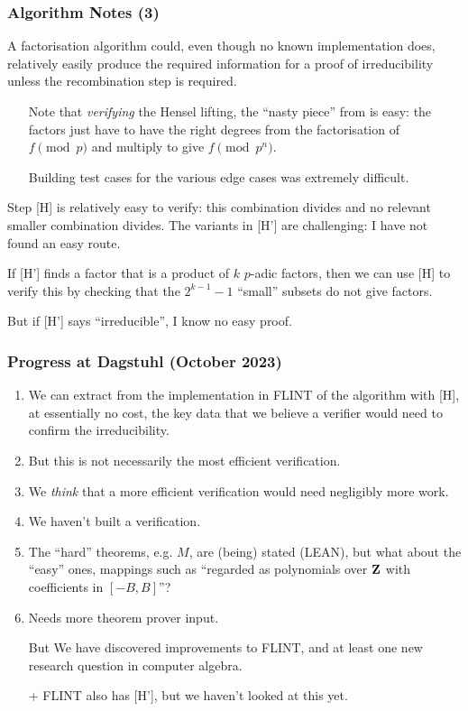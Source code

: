 \documentclass[handout]{beamer}   %
\begin{document}
\begin{frame}[fragile]
\frametitle{Algorithm Notes (3)}
A factorisation algorithm could, even though no known implementation does, relatively easily produce the required information for a proof of irreducibility unless the recombination step is required. \pause
\begin{enumerate}[<+->]
\item[Note]that \emph{verifying} the Hensel lifting, the ``nasty piece'' from \cite{MooreNorman1981} is easy: the factors just have to have the right degrees from the factorisation of $f \pmod p$ and multiply to give $f\pmod{p^n}$.
\item[\dbend]Building test cases for the various edge cases was extremely difficult.
\end{enumerate}
\pause
Step [H] is relatively easy to verify: this combination divides and no relevant smaller combination divides. \pause The variants in [H'] are challenging: I have not found an easy route. \par\pause
If [H'] finds a factor that is a product of $k$ $p$-adic factors, then we can use [H] to verify this by checking that the $2^{k-1}-1$ ``small'' subsets do not give factors.
\par\pause
But if [H'] says ``irreducible'', I know no easy proof.
\end{frame}
\begin{frame}[fragile]
\frametitle{Progress at Dagstuhl (October 2023)}
\pause
\begin{enumerate}[<+->]
\item
We can extract from the implementation in FLINT \cite{Flint2023a} of the algorithm with [H], at essentially no cost, the key data that we believe a verifier would need to confirm the irreducibility.
\item But this is not necessarily the most efficient verification.
\item We \emph{think} that a more efficient verification would need negligibly more work.
\item We haven't built a verification.
\item The ``hard'' theorems, e.g. $M$, are (being) stated (LEAN), but what about the ``easy'' ones, mappings such as ``regarded as polynomials over ${\bf Z}$ with coefficients in $[-B,B]$''?
\item Needs more theorem prover input.
\item[But]We have discovered improvements to FLINT, and at least one new research question in computer algebra.
\item[+]FLINT also has [H'], but we haven't looked at this yet.
\end{enumerate}
\end{frame}
\end{document}
